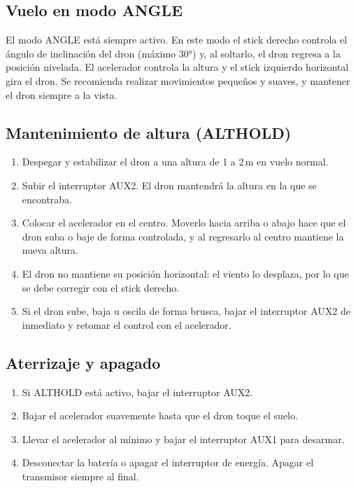\documentclass[11pt,letterpaper]{article}
\begin{document}
\subsection{Vuelo en modo ANGLE}
El modo ANGLE está siempre activo. En este modo el stick derecho controla el ángulo de inclinación del dron (máximo 30°) y, al soltarlo, el dron regresa a la posición nivelada. El acelerador controla la altura y el stick izquierdo horizontal gira el dron. Se recomienda realizar movimientos pequeños y suaves, y mantener el dron siempre a la vista.

\subsection{Mantenimiento de altura (ALTHOLD)}
\begin{enumerate}[nosep]
    \item Despegar y estabilizar el dron a una altura de 1 a 2\,m en vuelo normal.
    \item Subir el interruptor AUX2. El dron mantendrá la altura en la que se encontraba.
    \item Colocar el acelerador en el centro. Moverlo hacia arriba o abajo hace que el dron suba o baje de forma controlada, y al regresarlo al centro mantiene la nueva altura.
    \item El dron no mantiene su posición horizontal: el viento lo desplaza, por lo que se debe corregir con el stick derecho.
    \item Si el dron sube, baja u oscila de forma brusca, bajar el interruptor AUX2 de inmediato y retomar el control con el acelerador.
\end{enumerate}

\subsection{Aterrizaje y apagado}
\begin{enumerate}[nosep]
    \item Si ALTHOLD está activo, bajar el interruptor AUX2.
    \item Bajar el acelerador suavemente hasta que el dron toque el suelo.
    \item Llevar el acelerador al mínimo y bajar el interruptor AUX1 para desarmar.
    \item Desconectar la batería o apagar el interruptor de energía. Apagar el transmisor siempre al final.
\end{enumerate}
\end{document}
